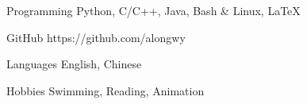 

\vspace{-1.5mm}
\begin{cvskills}


\cvskill
{Programming} %
{Python, C/C++, Java, Bash \& Linux, \LaTeX} %


\cvskill
{GitHub} %
{https://github.com/alongwy} %


\cvskill
{Languages} %
{English, Chinese} %

\cvskill
{Hobbies} %
{Swimming, Reading, Animation} %

\end{cvskills}